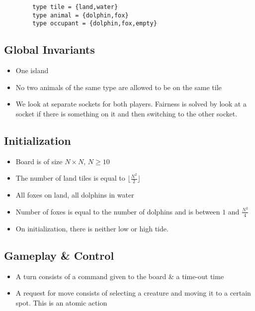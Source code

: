 \documentclass[a4paper,twoside,11pt]{article}
\begin{document}
    \begin{verbatim}
        type tile = {land,water}
        type animal = {dolphin,fox}
        type occupant = {dolphin,fox,empty}
    \end{verbatim}

    \subsection{Global Invariants}
    \begin{itemize}
        \item One island
        \item No two animals of the same type are allowed to be on the same tile
        \item We look at separate sockets for both players. Fairness is solved by look at a socket if there is something on it and then switching to the other socket.
    \end{itemize}

  \subsection{Initialization}

    \begin{itemize}
        \item Board is of size $N \times N$, $N \geq 10$
        \item The number of land tiles is equal to $\lfloor \frac{N^2}{2} \rfloor$
        \item All foxes on land, all dolphins in water
        \item Number of foxes is equal to the number of dolphins and is between $1$ and $\frac{N^{2}}{4}$
        \item On initialization, there is neither low or high tide.
    \end{itemize}



  \subsection{Gameplay \& Control} %
  \label{sec:gameplay_control}

    \begin{itemize}
      \item A turn consists of a command given to the board \& a time-out time
      \item A request for move consists of selecting a creature and moving it to a certain spot. This is an atomic action
    \end{itemize}
\end{document}
